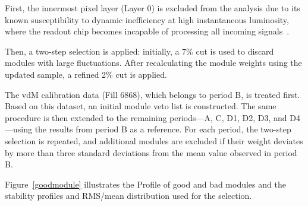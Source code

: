 First, the innermost pixel layer (Layer 0) is excluded from the analysis due to its known susceptibility to dynamic inefficiency at high instantaneous luminosity, where the readout chip becomes incapable of processing all incoming signals~\cite{pas_18}.

Then, a two-step selection is applied: initially, a 7\% cut is used to discard modules with large fluctuations. After recalculating the module weights using the updated sample, a refined 2\% cut is applied.

The vdM calibration data (Fill 6868), which belongs to period B, is treated first. Based on this dataset, an initial module veto list is constructed. The same procedure is then extended to the remaining periods—A, C, D1, D2, D3, and D4—using the results from period B as a reference. For each period, the two-step selection is repeated, and additional modules are excluded if their weight deviates by more than three standard deviations from the mean value observed in period B.

Figure~\ref{goodmodule} illustrates the Profile of good and bad modules and the stability profiles and RMS/mean distribution used for the selection.

